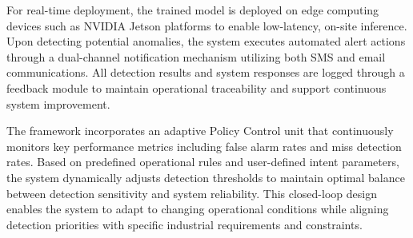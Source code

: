 For real-time deployment, the trained model is deployed on edge computing devices such as NVIDIA Jetson platforms to enable low-latency, on-site inference. Upon detecting potential anomalies, the system executes automated alert actions through a dual-channel notification mechanism utilizing both SMS and email communications. All detection results and system responses are logged through a feedback module to maintain operational traceability and support continuous system improvement.

The framework incorporates an adaptive Policy Control unit that continuously monitors key performance metrics including false alarm rates and miss detection rates. Based on predefined operational rules and user-defined intent parameters, the system dynamically adjusts detection thresholds to maintain optimal balance between detection sensitivity and system reliability. This closed-loop design enables the system to adapt to changing operational conditions while aligning detection priorities with specific industrial requirements and constraints. 